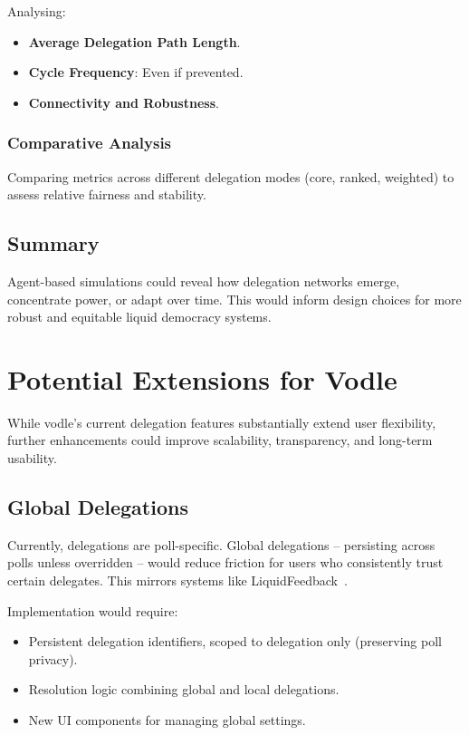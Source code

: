 Analysing:

\begin{itemize}
    \item \textbf{Average Delegation Path Length}.
    \item \textbf{Cycle Frequency}: Even if prevented.
    \item \textbf{Connectivity and Robustness}.
\end{itemize}

\subsubsection{Comparative Analysis}

Comparing metrics across different delegation modes (core, ranked, weighted) to assess relative fairness and stability.

\subsection{Summary}

Agent-based simulations could reveal how delegation networks emerge, concentrate power, or adapt over time. This would inform design choices for more robust and equitable liquid democracy systems.

\section{Potential Extensions for Vodle}

While vodle's current delegation features substantially extend user flexibility, further enhancements could improve scalability, transparency, and long-term usability.

\subsection{Global Delegations}

Currently, delegations are poll-specific. Global delegations -- persisting across polls unless overridden -- would reduce friction for users who consistently trust certain delegates. This mirrors systems like LiquidFeedback~\citep{behrens_liquidfeedback_2014}.

Implementation would require:

\begin{itemize}
    \item Persistent delegation identifiers, scoped to delegation only (preserving poll privacy).
    \item Resolution logic combining global and local delegations.
    \item New UI components for managing global settings.
\end{itemize}

